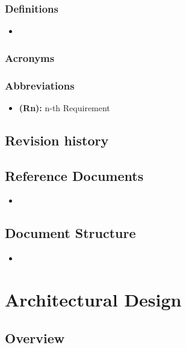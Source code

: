 \documentclass{article}
\begin{document}
	
	\subsubsection{Definitions}
	
	\begin{itemize}
	\item	
	\end{itemize}
	
	
	\subsubsection{Acronyms}
		
	\subsubsection{Abbreviations}
	
	\begin{itemize}
		\item {\bf (Rn):} n-th Requirement
	\end{itemize}
	
	
	\subsection{Revision history}

	
	
	\subsection{Reference Documents}
	
	\begin{itemize}
		\item 
	\end{itemize}
	
	
	\subsection{Document Structure}
	\begin{itemize}
		\item 
	\end{itemize}
	\pagebreak
	
	
\section{Architectural Design}
	\subsection{Overview}
	
\end{document}
